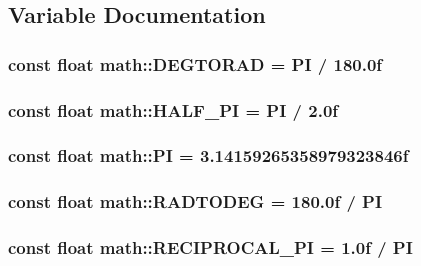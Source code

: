 \subsection{Variable Documentation}
\hypertarget{namespacemath_a587d3c31fcbb87c5ccd1d9bb53a001ab}{
\subsubsection[{DEGTORAD}]{\setlength{\rightskip}{0pt plus 5cm}const float {\bf math::DEGTORAD} = {\bf PI} / 180.0f}}
\label{namespacemath_a587d3c31fcbb87c5ccd1d9bb53a001ab}
\hypertarget{namespacemath_ab0c0d4b652877ea23c84cbd2ceaba14f}{
\subsubsection[{HALF\_\-PI}]{\setlength{\rightskip}{0pt plus 5cm}const float {\bf math::HALF\_\-PI} = {\bf PI} / 2.0f}}
\label{namespacemath_ab0c0d4b652877ea23c84cbd2ceaba14f}
\hypertarget{namespacemath_a6bc2e46a09ced59adc7ca762c21672e9}{
\subsubsection[{PI}]{\setlength{\rightskip}{0pt plus 5cm}const float {\bf math::PI} = 3.14159265358979323846f}}
\label{namespacemath_a6bc2e46a09ced59adc7ca762c21672e9}
\hypertarget{namespacemath_a16c58a21197921edbdf61706b7520088}{
\subsubsection[{RADTODEG}]{\setlength{\rightskip}{0pt plus 5cm}const float {\bf math::RADTODEG} = 180.0f / PI}}
\label{namespacemath_a16c58a21197921edbdf61706b7520088}
\hypertarget{namespacemath_a4ec943d35c300759d313db7a5c9a28ca}{
\subsubsection[{RECIPROCAL\_\-PI}]{\setlength{\rightskip}{0pt plus 5cm}const float {\bf math::RECIPROCAL\_\-PI} = 1.0f / PI}}
\label{namespacemath_a4ec943d35c300759d313db7a5c9a28ca}
